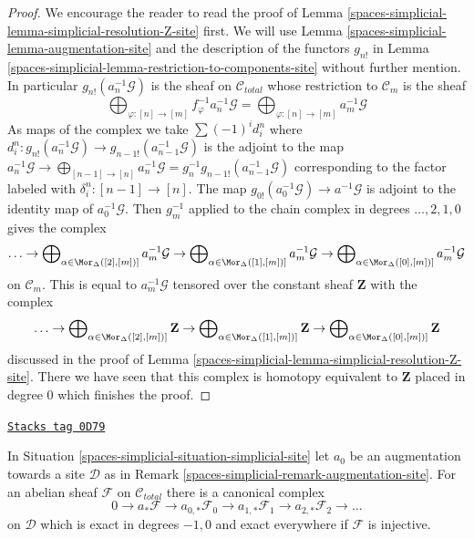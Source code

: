 \begin{proof}
We encourage the reader to read the proof of
Lemma \ref{spaces-simplicial-lemma-simplicial-resolution-Z-site} first.
We will use Lemma \ref{spaces-simplicial-lemma-augmentation-site} and
the description of the functors $g_{n!}$ in
Lemma \ref{spaces-simplicial-lemma-restriction-to-components-site} without further mention.
In particular $g_{n!}(a_n^{-1}\mathcal{G})$ is the
sheaf on $\mathcal{C}_{total}$ whose restriction to $\mathcal{C}_m$
is the sheaf
$$
\bigoplus\nolimits_{\varphi : [n] \to [m]} f_\varphi^{-1}a_n^{-1}\mathcal{G} =
\bigoplus\nolimits_{\varphi : [n] \to [m]} a_m^{-1}\mathcal{G}
$$
As maps of the complex we take $\sum (-1)^i d^n_i$ where
$d^n_i : g_{n!}(a_n^{-1}\mathcal{G}) \to g_{n - 1!}(a_{n - 1}^{-1}\mathcal{G})$
is the adjoint to the map
$a_n^{-1}\mathcal{G} \to \bigoplus_{[n - 1] \to [n]} a_n^{-1}\mathcal{G} =
g_n^{-1}g_{n - 1!}(a_{n - 1}^{-1}\mathcal{G})$
corresponding to the factor labeled with $\delta^n_i : [n - 1] \to [n]$.
The map $g_{0!}(a_0^{-1}\mathcal{G}) \to a^{-1}\mathcal{G}$ is adjoint
to the identity map of $a_0^{-1}\mathcal{G}$.
Then $g_m^{-1}$ applied to the chain complex in degrees
$\ldots, 2, 1, 0$ gives the complex
$$
\ldots \to
\bigoplus\nolimits_{\alpha \in \Mor_\Delta([2], [m])]} a_m^{-1}\mathcal{G} \to
\bigoplus\nolimits_{\alpha \in \Mor_\Delta([1], [m])]} a_m^{-1}\mathcal{G} \to
\bigoplus\nolimits_{\alpha \in \Mor_\Delta([0], [m])]} a_m^{-1}\mathcal{G}
$$
on $\mathcal{C}_m$. This is equal to $a_m^{-1}\mathcal{G}$
tensored over the constant sheaf $\mathbf{Z}$ with the complex
$$
\ldots \to
\bigoplus\nolimits_{\alpha \in \Mor_\Delta([2], [m])]} \mathbf{Z} \to
\bigoplus\nolimits_{\alpha \in \Mor_\Delta([1], [m])]} \mathbf{Z} \to
\bigoplus\nolimits_{\alpha \in \Mor_\Delta([0], [m])]} \mathbf{Z}
$$
discussed in the proof of Lemma \ref{spaces-simplicial-lemma-simplicial-resolution-Z-site}.
There we have seen that this complex is homotopy equivalent to
$\mathbf{Z}$ placed in degree $0$ which finishes the proof.
\end{proof}

\begin{lemma}
\label{spaces-simplicial-lemma-augmentation-cech-complex}
\href{https://stacks.math.columbia.edu/tag/0D79}{\texttt{Stacks tag 0D79}}

In Situation \ref{spaces-simplicial-situation-simplicial-site} let
$a_0$ be an augmentation towards a site $\mathcal{D}$
as in Remark \ref{spaces-simplicial-remark-augmentation-site}.
For an abelian sheaf $\mathcal{F}$ on $\mathcal{C}_{total}$
there is a canonical complex
$$
0 \to a_*\mathcal{F} \to a_{0, *}\mathcal{F}_0 \to a_{1, *}\mathcal{F}_1 \to
a_{2, *}\mathcal{F}_2 \to \ldots
$$
on $\mathcal{D}$ which is exact in degrees $-1, 0$ and
exact everywhere if $\mathcal{F}$ is injective.
\end{lemma}

